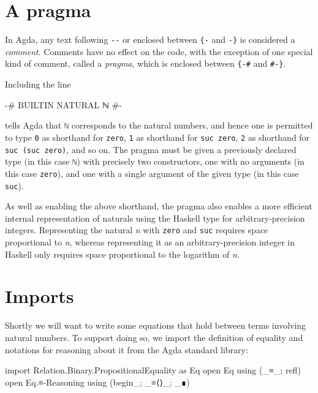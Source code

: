 \hypertarget{a-pragma}{%
\section{A pragma}\label{a-pragma}}

In Agda, any text following \texttt{-\/-} or enclosed between
\texttt{\{-} and \texttt{-\}} is considered a \emph{comment}. Comments
have no effect on the code, with the exception of one special kind of
comment, called a \emph{pragma}, which is enclosed between
\texttt{\{-\#} and \texttt{\#-\}}.

Including the line

\begin{fence}
\begin{code}
{-# BUILTIN NATURAL ℕ #-}
\end{code}
\end{fence}

tells Agda that \texttt{ℕ} corresponds to the natural numbers, and hence
one is permitted to type \texttt{0} as shorthand for \texttt{zero},
\texttt{1} as shorthand for \texttt{suc\ zero}, \texttt{2} as shorthand
for \texttt{suc\ (suc\ zero)}, and so on. The pragma must be given a
previously declared type (in this case \texttt{ℕ}) with precisely two
constructors, one with no arguments (in this case \texttt{zero}), and
one with a single argument of the given type (in this case
\texttt{suc}).

As well as enabling the above shorthand, the pragma also enables a more
efficient internal representation of naturals using the Haskell type for
arbitrary-precision integers. Representing the natural \emph{n} with
\texttt{zero} and \texttt{suc} requires space proportional to \emph{n},
whereas representing it as an arbitrary-precision integer in Haskell
only requires space proportional to the logarithm of \emph{n}.

\hypertarget{imports}{%
\section{Imports}\label{imports}}

Shortly we will want to write some equations that hold between terms
involving natural numbers. To support doing so, we import the definition
of equality and notations for reasoning about it from the Agda standard
library:

\begin{fence}
\begin{code}
import Relation.Binary.PropositionalEquality as Eq
open Eq using (_≡_; refl)
open Eq.≡-Reasoning using (begin_; _≡⟨⟩_; _∎)
\end{code}
\end{fence}

